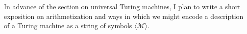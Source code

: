 \label{sec:encodingturingmachines}

\begin{construction}
In advance of the section on universal Turing machines, I plan to write a short exposition on arithmetization and ways in which we might encode a description of a Turing machine as a string of symbols $\langle \mathcal{M} \rangle$.
\end{construction}